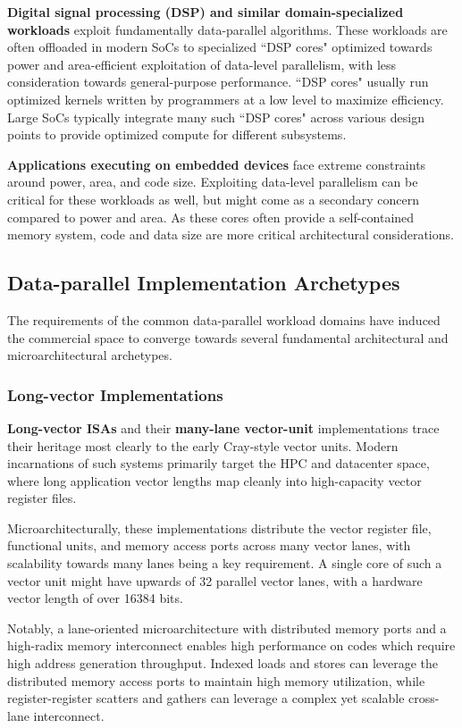 \textbf{Digital signal processing (DSP) and similar domain-specialized workloads} exploit fundamentally data-parallel algorithms.
These workloads are often offloaded in modern SoCs to specialized ``DSP cores" optimized towards power and area-efficient exploitation of data-level parallelism, with less consideration towards general-purpose performance.
``DSP cores" usually run optimized kernels written by programmers at a low level to maximize efficiency. 
Large SoCs typically integrate many such ``DSP cores" across various design points to provide optimized compute for different subsystems.

\textbf{Applications executing on embedded devices} face extreme constraints around power, area, and code size.
Exploiting data-level parallelism can be critical for these workloads as well, but might come as a secondary concern compared to power and area.
As these cores often provide a self-contained memory system, code and data size are more critical architectural considerations.

\subsection{Data-parallel Implementation Archetypes}

The requirements of the common data-parallel workload domains have induced the commercial space to converge towards several fundamental architectural and microarchitectural archetypes.

\subsubsection{Long-vector Implementations}

\textbf{Long-vector ISAs} and their \textbf{many-lane vector-unit} implementations trace their heritage most clearly to the early Cray-style vector units.
Modern incarnations of such systems primarily target the HPC and datacenter space, where long application vector lengths map cleanly into high-capacity vector register files.

Microarchitecturally, these implementations distribute the vector register file, functional units, and memory access ports across many vector lanes, with scalability towards many lanes being a key requirement.
A single core of such a vector unit might have upwards of 32 parallel vector lanes, with a hardware vector length of over 16384 bits.

Notably, a lane-oriented microarchitecture with distributed memory ports and a high-radix memory interconnect enables high performance on codes which require high address generation throughput.
Indexed loads and stores can leverage the distributed memory access ports to maintain high memory utilization, while register-register scatters and gathers can leverage a complex yet scalable cross-lane interconnect.

